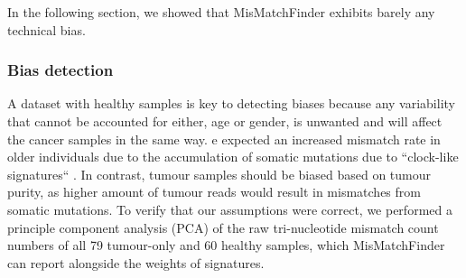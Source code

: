 In the following section, we showed that MisMatchFinder exhibits barely any technical bias.

\subsubsection{Bias detection}
\label{mmf-sec:healthyBias}
A dataset with healthy samples is key to detecting biases because any variability that cannot be accounted for either, age or gender, is unwanted and will affect the cancer samples in the same way. e expected an increased mismatch rate in older individuals due to the accumulation of somatic mutations due to ``clock-like signatures`` \cite{Abascal2021}. In contrast, tumour samples should be biased based on tumour purity, as higher amount of tumour reads would result in  mismatches from somatic mutations.
To verify that our assumptions were correct, we performed a principle component analysis (PCA) of the raw tri-nucleotide mismatch count numbers of all 79 tumour-only and 60 healthy samples, which MisMatchFinder can report alongside the weights of signatures.

